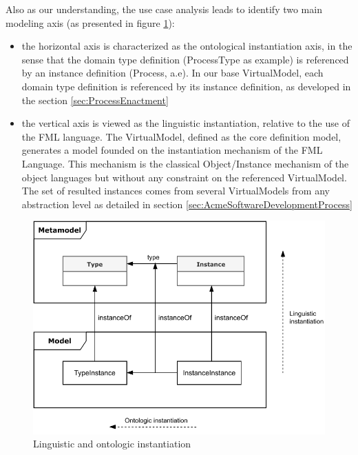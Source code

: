 Also as our understanding, the use case analysis leads to identify two main modeling axis (as presented in figure \ref{fig:LinguisticAndOntologicInstantiation}):
\begin{itemize}
    \item the horizontal axis is characterized as the ontological instantiation axis, in the sense that the domain type definition (ProcessType as example) is referenced by an instance definition (Process, a.e). In our base  VirtualModel, each domain type definition is referenced by its instance definition, as developed in the section \ref{sec:ProcessEnactment}

\item the vertical axis is viewed as the linguistic instantiation, relative to the use of the FML language. The VirtualModel, defined as the core definition model, generates a model founded on the instantiation mechanism of the FML Language. This mechanism is the classical Object/Instance mechanism of the object languages but without any constraint on the referenced VirtualModel. The set of resulted instances comes from several VirtualModels 
from any abstraction level as detailed in section \ref{sec:AcmeSoftwareDevelopmentProcess}


\end{itemize}

\begin{figure}
    \centering
    \includegraphics[width=1.0 \columnwidth]{Figures/Instantiation.pdf}
    \caption{Linguistic and ontologic instantiation}
    \label{fig:LinguisticAndOntologicInstantiation}
\end{figure}

